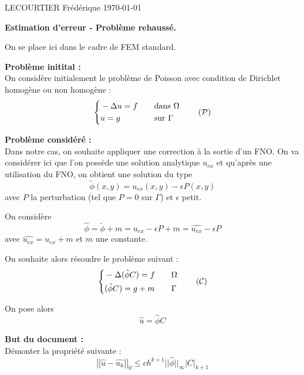 \documentclass[french]{article}
\begin{document}
	LECOURTIER Frédérique \hfill \today
	\begin{center}
		\Large\textbf{{Estimation d'erreur - Problème rehaussé.}}\\
	\end{center}

	On se place ici dans le cadre de FEM standard. 
	
	\textbf{Problème initital :} \\
	On considère initialement le problème de Poisson avec condition de Dirichlet homogène ou non homogène :
	\begin{equation}
		\left\{\begin{aligned}
			&-\Delta u=f \quad &&\text{dans } \Omega \\
			&u=g \quad &&\text{sur } \Gamma
		\end{aligned}\right. \label{pb_initial} \tag{$\mathcal{P}$}
	\end{equation}

	\textbf{Problème considéré :} \\
	Dans notre cas, on souhaite appliquer une correction à la sortie d'un FNO.
	On va considérer ici que l'on possède une solution analytique $u_{ex}$ et qu'après une utilisation du FNO, on obtient une solution du type
	$$\tilde{\phi}(x,y) = u_{ex}(x,y)-\epsilon P(x,y)$$
	avec $P$ la perturbation (tel que $P=0$ sur $\Gamma$) et $\epsilon$ petit.
	
	On considère
	$$\hat{\phi}=\tilde{\phi}+m=u_{ex}-\epsilon P+m=\widehat{u_{ex}}-\epsilon P$$
	avec $\widehat{u_{ex}}=u_{ex}+m$ et $m$ une constante.
	
	On souhaite alors résoudre le problème suivant :
	\begin{equation}
		\left\{\begin{aligned}
			&-\Delta (\hat{\phi}C)=f \quad &&\Omega \\
			&(\hat{\phi}C)=g+m \quad &&\Gamma
		\end{aligned}\right. \label{pb_reh} \tag{$\mathcal{C}$}
	\end{equation}

	On pose alors
	$$\hat{u}=\hat{\phi}C$$

	\textbf{But du document :} \\
	Démonter la propriété suivante :
	\begin{equation}
		\left|\left|\hat{u}-\hat{u_h}\right|\right|_0\le ch^{k+1}||\hat{\phi}||_\infty\left|C\right|_{k+1}
		\label{ine_a_dem}
	\end{equation}
	
\end{document}
